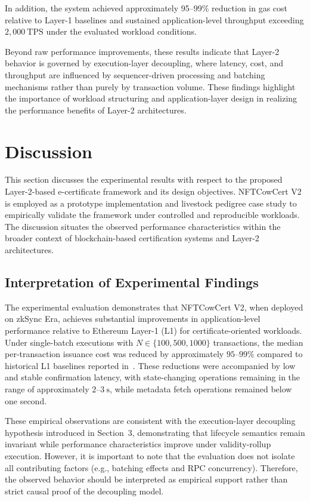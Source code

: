 \documentclass[pdflatex,sn-mathphys-num]{sn-jnl}
\begin{document}
In addition, the system achieved approximately 95--99\% reduction in gas cost relative to Layer-1 baselines and sustained application-level throughput exceeding $2{,}000~\mathrm{TPS}$ under the evaluated workload conditions.

Beyond raw performance improvements, these results indicate that Layer-2 behavior is governed by execution-layer decoupling, where latency, cost, and throughput are influenced by sequencer-driven processing and batching mechanisms rather than purely by transaction volume. These findings highlight the importance of workload structuring and application-layer design in realizing the performance benefits of Layer-2 architectures.


\section{Discussion}

This section discusses the experimental results with respect to the proposed Layer-2-based e-certificate framework and its design objectives. NFTCowCert V2 is employed as a prototype implementation and livestock pedigree case study to empirically validate the framework under controlled and reproducible workloads. The discussion situates the observed performance characteristics within the broader context of blockchain-based certification systems and Layer-2 architectures.

\subsection{Interpretation of Experimental Findings}

The experimental evaluation demonstrates that NFTCowCert V2, when deployed on zkSync Era, achieves substantial improvements in application-level performance relative to Ethereum Layer-1 (L1) for certificate-oriented workloads. Under single-batch executions with $N \in \{100, 500, 1000\}$ transactions, the median per-transaction issuance cost was reduced by approximately $95$--$99\%$ compared to historical L1 baselines reported in~\cite{bangnikrai2022blockchain}. These reductions were accompanied by low and stable confirmation latency, with state-changing operations remaining in the range of approximately $2$--$3~\mathrm{s}$, while metadata fetch operations remained below one second.

These empirical observations are consistent with the execution-layer decoupling hypothesis introduced in Section~3, demonstrating that lifecycle semantics remain invariant while performance characteristics improve under validity-rollup execution. However, it is important to note that the evaluation does not isolate all contributing factors (e.g., batching effects and RPC concurrency). Therefore, the observed behavior should be interpreted as empirical support rather than strict causal proof of the decoupling model.
\end{document}
